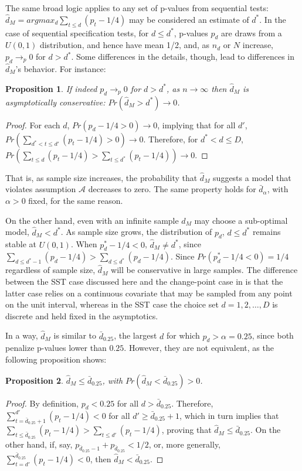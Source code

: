 \documentclass[lineno]{biometrika}\usepackage[]{graphicx}\usepackage[]{color}
\newcommand{\dalphaU}{\bar{d}_\alpha}
\newcommand{\dstar}{d^*}
\newcommand{\dhatU}{\bar{d}}
\newcommand{\dhatm}{\hat{d}_M}
\newtheorem{prop}{Proposition}
\begin{document}
The same broad logic applies to any set of p-values from sequential tests:
$\dhatm=argmax_d \sum_{t\le d} (p_t-1/4)$ may be considered an
estimate of $\dstar$.
In the case of sequential specification tests, for $d\le \dstar$, p-values $p_d$ are draws from
a $U(0,1)$ distribution, and hence have mean 1/2, and, as $n_d$ or $N$
increase, $p_d \rightarrow_p 0$ for $d>\dstar$.
Some differences in the details, though, lead to differences in
$\dhatm$'s behavior.
For instance:
\begin{prop}
If indeed $p_d\rightarrow_p 0$ for $d>\dstar$, as $n\rightarrow\infty$ then $\dhatm$ is asymptotically conservative:
$Pr(\dhatm>\dstar)\rightarrow 0$.
\end{prop}
\begin{proof}
For each $d$, $Pr(p_d -1/4>0)\rightarrow 0$, implying that for all $d'$, $Pr(\sum_{\dstar <t\le d'}
(p_t-1/4)>0)\rightarrow 0$.
Therefore, for $\dstar<d\le D$, $Pr(\sum_{t\le d} (p_t-1/4)> \sum_{t\le
  \dstar} (p_t-1/4))\rightarrow 0$.
\end{proof}
That is, as sample size increases, the probability that $\dhatm$
suggests a model that violates assumption $\mathcal{A}$ decreases to
zero.
The same property holds for $\dalphaU$, with $\alpha>0$ fixed, for
the same reason.

On the other hand, even with an infinite sample $\dhatm$ may choose a
sub-optimal model, $\dhatm<\dstar$.
As sample size grows, the distribution of $p_d$, $d\le \dstar$ remains
stable at $U(0,1)$.
When $p_\dstar-1/4<0$, $\dhatm \neq \dstar$, since $\sum_{d\le
  \dstar-1} (p_d-1/4)>\sum_{d\le \dstar} (p_d-1/4)$.
Since $Pr(p_\dstar-1/4<0)=1/4$ regardless of sample size, $\dhatm$
will be conservative in large samples.
The difference between the SST case discussed here and the
change-point case in \citet{mallik} is that the latter case relies on
a continuous covariate that may be sampled from any point on the unit
interval, whereas in the SST case the choice set $d=1,2,\dots,D$ is
discrete and held fixed in the asymptotics.

In a way, $\dhatm$ is similar to $\dhatU_{0.25}$, the largest $d$ for
which $p_d>\alpha=0.25$, since both penalize p-values lower than
$0.25$.
However, they are not equivalent, as the following proposition shows:
\begin{prop}
$\dhatm \le \dhatU_{0.25}$, with $Pr(\dhatm < \dhatU_{0.25})>0$.
\end{prop}
\begin{proof}
By definition, $p_d<0.25$ for all $d>\dhatU_{0.25}$. Therefore,
$\sum_{t=\dhatU_{0.25}+1}^{d'}(p_t-1/4)<0$ for all $d'\ge
\dhatU_{0.25}+1$, which in turn implies that $\sum_{t\le
  \dhatU_{0.25}}(p_t-1/4)>\sum_{t\le d'}(p_t-1/4)$, proving that
$\dhatm\le \dhatU_{0.25}$. On the other hand, if, say,
$p_{\dhatU_{0.25}-1}+p_{\dhatU_{0.25}}<1/2$, or, more generally,
$\sum_{t=d'}^{\dhatU_{0.25}}(p_t-1/4)<0$, then $\dhatm<\dhatU_{0.25}$.
\end{proof}
\end{document}
